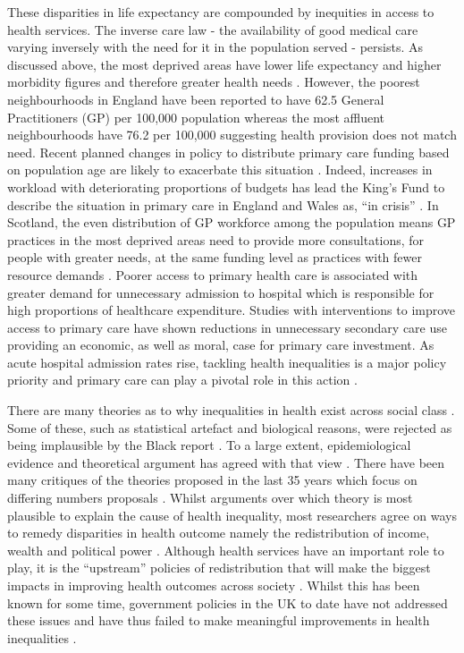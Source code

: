 \documentclass[12pt,]{report}
\begin{document}
These disparities in life expectancy are compounded by inequities in
access to health services. The inverse care law - the availability of
good medical care varying inversely with the need for it in the
population served \citep{RN120} - persists. As discussed above, the most
deprived areas have lower life expectancy and higher morbidity figures
and therefore greater health needs \citep{RN37}. However, the poorest
neighbourhoods in England have been reported to have 62.5 General
Practitioners (GP) per 100,000 population whereas the most affluent
neighbourhoods have 76.2 per 100,000 \citep{RN317} suggesting health
provision does not match need. Recent planned changes in policy to
distribute primary care funding based on population age are likely to
exacerbate this situation \citep{RN39}. Indeed, increases in workload
with deteriorating proportions of budgets has lead the King's Fund to
describe the situation in primary care in England and Wales as, ``in
crisis'' \citep[pp.3]{RN318}. In Scotland, the even distribution of GP
workforce among the population means GP practices in the most deprived
areas need to provide more consultations, for people with greater needs,
at the same funding level as practices with fewer resource demands
\citep{RN148, RN27}. Poorer access to primary health care is associated
with greater demand for unnecessary admission to hospital
\citep{RN49, RN268} which is responsible for high proportions of
healthcare expenditure. Studies with interventions to improve access to
primary care have shown reductions in unnecessary secondary care use
\citep{RN245, RN246, RN272} providing an economic, as well as moral,
case for primary care investment. As acute hospital admission rates
rise, tackling health inequalities is a major policy priority and
primary care can play a pivotal role in this action \citep{RN319}.

There are many theories as to why inequalities in health exist across
social class \citep{RN327, RN333}. Some of these, such as statistical
artefact and biological reasons, were rejected as being implausible by
the Black report \citep{RN277}. To a large extent, epidemiological
evidence and theoretical argument has agreed with that view
\citep{RN327, RN83, RN82, RN333}. There have been many critiques of the
theories proposed in the last 35 years which focus on differing numbers
proposals \citep{RN327, RN333, RN377, RN378, RN83}. Whilst arguments
over which theory is most plausible to explain the cause of health
inequality, most researchers agree on ways to remedy disparities in
health outcome namely the redistribution of income, wealth and political
power \citep{RN378, RN391, RN327, RN333}. Although health services have
an important role to play, it is the ``upstream'' policies of
redistribution that will make the biggest impacts in improving health
outcomes across society \citep{RN378, RN391, RN327, RN325}. Whilst this
has been known for some time, government policies in the UK to date have
not addressed these issues and have thus failed to make meaningful
improvements in health inequalities \citep{RN330, RN331, RN377}.
\end{document}
